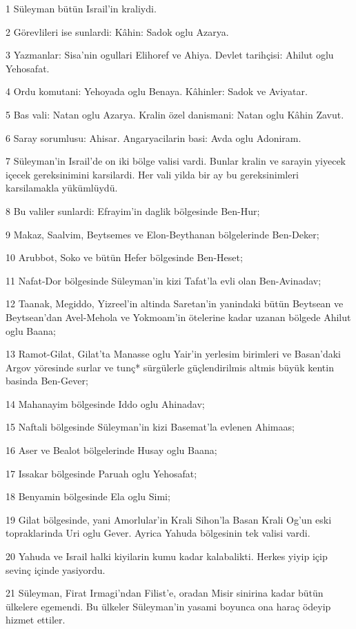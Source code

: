 \par 1 Süleyman bütün Israil'in kraliydi.
\par 2 Görevlileri ise sunlardi: Kâhin: Sadok oglu Azarya.
\par 3 Yazmanlar: Sisa'nin ogullari Elihoref ve Ahiya. Devlet tarihçisi: Ahilut oglu Yehosafat.
\par 4 Ordu komutani: Yehoyada oglu Benaya. Kâhinler: Sadok ve Aviyatar.
\par 5 Bas vali: Natan oglu Azarya. Kralin özel danismani: Natan oglu Kâhin Zavut.
\par 6 Saray sorumlusu: Ahisar. Angaryacilarin basi: Avda oglu Adoniram.
\par 7 Süleyman'in Israil'de on iki bölge valisi vardi. Bunlar kralin ve sarayin yiyecek içecek gereksinimini karsilardi. Her vali yilda bir ay bu gereksinimleri karsilamakla yükümlüydü.
\par 8 Bu valiler sunlardi: Efrayim'in daglik bölgesinde Ben-Hur;
\par 9 Makaz, Saalvim, Beytsemes ve Elon-Beythanan bölgelerinde Ben-Deker;
\par 10 Arubbot, Soko ve bütün Hefer bölgesinde Ben-Heset;
\par 11 Nafat-Dor bölgesinde Süleyman'in kizi Tafat'la evli olan Ben-Avinadav;
\par 12 Taanak, Megiddo, Yizreel'in altinda Saretan'in yanindaki bütün Beytsean ve Beytsean'dan Avel-Mehola ve Yokmoam'in ötelerine kadar uzanan bölgede Ahilut oglu Baana;
\par 13 Ramot-Gilat, Gilat'ta Manasse oglu Yair'in yerlesim birimleri ve Basan'daki Argov yöresinde surlar ve tunç* sürgülerle güçlendirilmis altmis büyük kentin basinda Ben-Gever;
\par 14 Mahanayim bölgesinde Iddo oglu Ahinadav;
\par 15 Naftali bölgesinde Süleyman'in kizi Basemat'la evlenen Ahimaas;
\par 16 Aser ve Bealot bölgelerinde Husay oglu Baana;
\par 17 Issakar bölgesinde Paruah oglu Yehosafat;
\par 18 Benyamin bölgesinde Ela oglu Simi;
\par 19 Gilat bölgesinde, yani Amorlular'in Krali Sihon'la Basan Krali Og'un eski topraklarinda Uri oglu Gever. Ayrica Yahuda bölgesinin tek valisi vardi.
\par 20 Yahuda ve Israil halki kiyilarin kumu kadar kalabalikti. Herkes yiyip içip sevinç içinde yasiyordu.
\par 21 Süleyman, Firat Irmagi'ndan Filist'e, oradan Misir sinirina kadar bütün ülkelere egemendi. Bu ülkeler Süleyman'in yasami boyunca ona haraç ödeyip hizmet ettiler.

